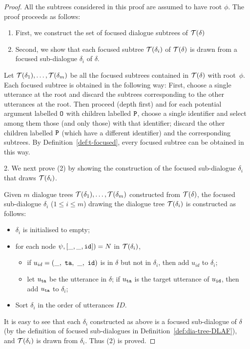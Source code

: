 \begin{proof}
All the subtrees considered in this proof are assumed to have root $\phi$.
The proof proceeds as follows:
\begin{enumerate}  
    \item First, we construct the set of focused dialogue subtrees of $\mathcal{T}(\delta)$
    \item Second, we show that each focused subtree $\mathcal{T}(\delta_i)$ of $\mathcal{T}(\delta)$ is drawn from a focused sub-dialogue $\delta_i$ of $\delta$.
\end{enumerate}

Let $\mathcal{T}(\delta_1), \ldots, \mathcal{T}(\delta_m)$ be all the focused subtrees contained
in $\mathcal{T}(\delta)$ with root~$\phi$. Each focused subtree is obtained in the following way:
First, choose a single utterance at the root and discard the subtrees corresponding to the other utterances at the root. Then proceed (depth first) and for each potential argument
labelled $\texttt{\textup{O}}$ with children labelled $\texttt{\textup{P}}$, choose a single identifier and select
among them those (and only those) with that identifier; discard the other children labelled $\texttt{\textup{P}}$ (which have a different identifier) and the corresponding subtrees.
By Definition~\ref{def:t-focused}, every focused subtree can be obtained in this way.


2. We next prove (2) by showing the construction of the focused sub-dialogue $\delta_i$ that draws $\mathcal{T}(\delta_i)$.

 Given $m$ dialogue trees $\mathcal{T}(\delta_1), \ldots, \mathcal{T}(\delta_m)$ constructed from $\mathcal{T}(\delta)$, the focused sub-dialogue $\delta_i$ ($1 \leq i \leq m$) drawing the dialogue tree $\mathcal{T}(\delta_i)$ is constructed as follows:

\begin{itemize}
    \item $\delta_i$ is initialised to empty;
    \item for each node $\psi, [ \_ , \_ , \texttt{\textup{id}}]) = N $ in $\mathcal{T}(\delta_i)$,
    \begin{itemize}
        \item if $u_{id} = (\_ ,\ \texttt{\textup{ta}},\ \_ ,\ \texttt{\textup{id}} )$ is in $\delta$ but not in $\delta_i$, then add $u_{id}$ to $\delta_i$;
        \item let $u_{\texttt{\textup{ta}}}$ be the utterance in $\delta$; if $u_{\texttt{\textup{ta}}}$ is the target utterance of $u_{\texttt{\textup{id}}}$, then add $u_{\texttt{\textup{ta}}}$ to $\delta_i$;
    \end{itemize}
    \item Sort $\delta_i$ in the order of utterances $ID$.
\end{itemize}

It is easy to see that each $\delta_i$ constructed as above is a focused sub-dialogue of $\delta$ (by the definition of focused sub-dialogues in Definition~\ref{def:dia-tree-DLAF}), and $\mathcal{T}(\delta_i)$ is drawn from $\delta_i$. Thus (2) is proved.
\end{proof}


